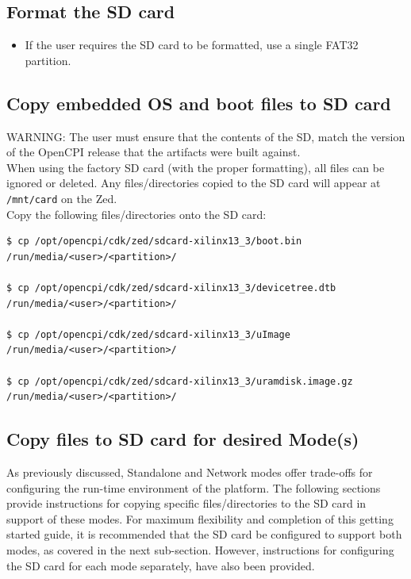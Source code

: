 \subsection{Format the SD card}
\begin{itemize}
\item If the user requires the SD card to be formatted, use a single FAT32 partition.
\end{itemize}

\subsection{Copy embedded OS and boot files to SD card}
\label{sec:Copy embedded OS and boot files to SD card}
WARNING: The user must ensure that the contents of the SD, match the version of the OpenCPI release that the artifacts were built against.\\

\noindent When using the factory SD card (with the proper formatting), all files can be ignored or deleted. Any files/directories copied to the SD card will appear at \texttt{/mnt/card} on the Zed.\\

\noindent Copy the following files/directories onto the SD card:
\begin{verbatim}
$ cp /opt/opencpi/cdk/zed/sdcard-xilinx13_3/boot.bin /run/media/<user>/<partition>/

$ cp /opt/opencpi/cdk/zed/sdcard-xilinx13_3/devicetree.dtb /run/media/<user>/<partition>/

$ cp /opt/opencpi/cdk/zed/sdcard-xilinx13_3/uImage /run/media/<user>/<partition>/

$ cp /opt/opencpi/cdk/zed/sdcard-xilinx13_3/uramdisk.image.gz /run/media/<user>/<partition>/
\end{verbatim}\medskip

\subsection{Copy files to SD card for desired Mode(s)}
As previously discussed, Standalone and Network modes offer trade-offs for configuring the run-time environment of the platform. The following sections provide instructions for copying specific files/directories to the SD card in support of these modes. For maximum flexibility and completion of this getting started guide, it is recommended that the SD card be configured to support both modes, as covered in the next sub-section. However, instructions for configuring the SD card for each mode separately, have also been provided.

